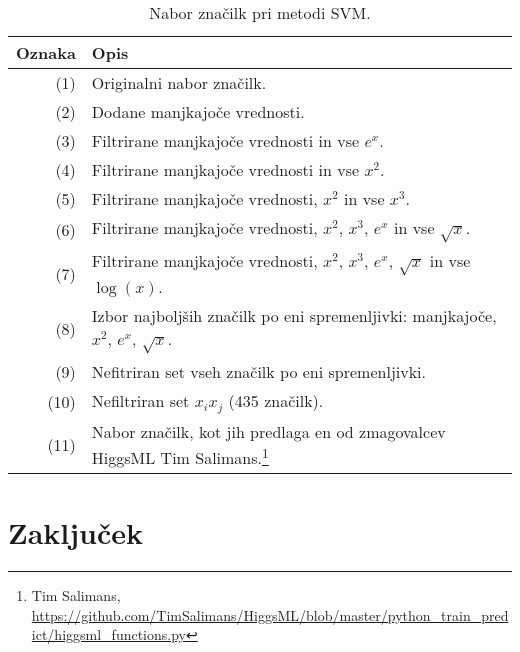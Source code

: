 \documentclass[11pt,a4paper,openany]{book}
\begin{document}
\begin{table}[h!]
	\centering
	\begin{tabular}{r|l}
		\textbf{Oznaka} & \textbf{Opis} \\
		\hline
		(1) & Originalni nabor značilk. \\
		(2) & Dodane manjkajoče vrednosti. \\
		(3) & Filtrirane manjkajoče vrednosti in vse $e^x$. \\
		(4) & Filtrirane manjkajoče vrednosti in vse $x^2$. \\
		(5) & Filtrirane manjkajoče vrednosti, $x^2$ in vse $x^3$. \\
		(6) & Filtrirane manjkajoče vrednosti, $x^2$, $x^3$, $e^x$ in vse $\sqrt{x}$. \\
		(7) & Filtrirane manjkajoče vrednosti, $x^2$, $x^3$, $e^x$, $\sqrt{x}$ in vse $\log(x)$. \\
		(8) & Izbor najboljših značilk po eni spremenljivki: manjkajoče, $x^2$, $e^x$, $\sqrt{x}$. \\
		(9) & Nefitriran set vseh značilk po eni spremenljivki. \\
		(10) & Nefiltriran set $x_ix_j$ (435 značilk). \\
		(11) & Nabor značilk, kot jih predlaga en od zmagovalcev HiggsML Tim Salimans.\footnote{Tim Salimans, \url{https://github.com/TimSalimans/HiggsML/blob/master/python_train_predict/higgsml_functions.py}}
	\end{tabular}
	\caption{Nabor značilk pri metodi SVM.}	
\end{table}


\chapter*{Zaključek}




\end{document}
